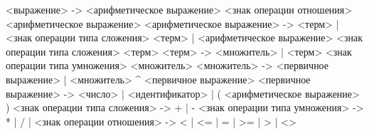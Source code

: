 <выражение> -> <арифметическое выражение> <знак операции отношения> <арифметическое выражение>
<арифметическое выражение> -> <терм> | <знак операции типа сложения> <терм> | <арифметическое выражение> <знак операции типа сложения> <терм>
<терм> -> <множитель> | <терм> <знак операции типа умножения> <множитель>
<множитель> -> <первичное выражение> | <множитель> ^ <первичное выражение>
<первичное выражение> -> <число> | <идентификатор> | ( <арифметическое выражение> )
<знак операции типа сложения> -> + | -
<знак операции типа умножения> -> * | / | %
<знак операции отношения> -> < | <= | = | >= | > | <>